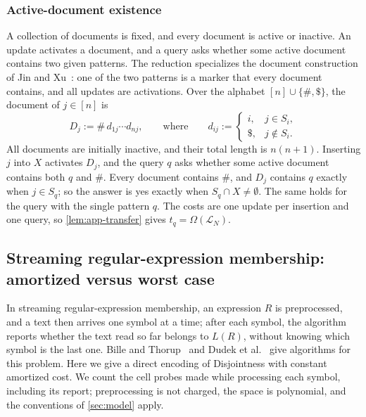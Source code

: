 \subsubsection{Active-document existence}\label{sec:active-documents}

A collection of documents is fixed, and every document is active or inactive. An update activates a document, and a query asks whether some active document contains two given patterns. The reduction specializes the document construction of Jin and Xu~\cite[Section~3.3, proof of Theorem~1.7]{jin_tight_2022}: one of the two patterns is a marker that every document contains, and all updates are activations. Over the alphabet $[n]\cup\{\#,\$\}$, the document of $j\in[n]$ is
\[
D_j:=\#\,d_{1j}\cdots d_{nj},\qquad\text{where}\qquad
d_{ij}:=\begin{cases}
i,&j\in S_i,\\
\$,&j\notin S_i.
\end{cases}
\]
All documents are initially inactive, and their total length is $n(n+1)$. Inserting $j$ into $X$ activates $D_j$, and the query $q$ asks whether some active document contains both $q$ and $\#$. Every document contains $\#$, and $D_j$ contains $q$ exactly when $j\in S_q$; so the answer is yes exactly when $S_q\cap X\ne\emptyset$. The same holds for the query with the single pattern $q$. The costs are one update per insertion and one query, so \cref{lem:app-transfer} gives $t_q=\Omega(\mathcal L_N)$.

\subsection{Streaming regular-expression membership: amortized versus worst case}\label{sec:streaming-regex}

In streaming regular-expression membership, an expression $R$ is preprocessed, and a text then arrives one symbol at a time; after each symbol, the algorithm reports whether the text read so far belongs to $L(R)$, without knowing which symbol is the last one. Bille and Thorup~\cite{bille_regular_2010} and Dudek et al.~\cite{naor_streaming_2022} give algorithms for this problem. Here we give a direct encoding of Disjointness with constant amortized cost. We count the cell probes made while processing each symbol, including its report; preprocessing is not charged, the space is polynomial, and the conventions of \cref{sec:model} apply.

